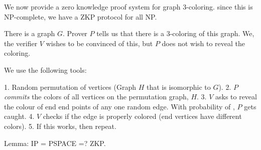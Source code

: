 \documentclass[11pt]{article}
\begin{document}
We now provide a zero knowledge proof system for graph 3-coloring.
since this is NP-complete, we have a ZKP protocol for all NP.

There is a graph $G$. Prover $P$ tells us that there is a 3-coloring of this graph. We, the
verifier $V$ wishes to be convinced of this, but $P$ does not wish to reveal the coloring.

We use the following tools:

1. Random permutation of vertices (Graph $H$ that is isomorphic to $G$).
2. $P$ \textit{commits} the colors of all vertices on the permutation graph, $H$.
3. $V$ asks to reveal the colour of end end points of any one random edge.
With probability of , $P$ gets caught.
4. $V$ checks if the edge is properly colored (end vertices have different colors).
5. If this works, then repeat.

Lemma: IP = PSPACE =? ZKP.
\end{document}
